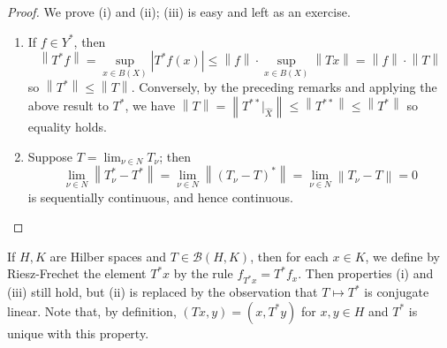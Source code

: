 \documentclass[11pt, a4paper]{memoir}
\newcommand{\norm}[1]{\ensuremath{\left\lVert#1\right\rVert}}
\theoremstyle{change}
\theoremstyle{plain}
\theoremstyle{nonumberplain}
\newtheorem{proof}{Proof}
\newcommand{\inr}[1]{\ensuremath{\left(#1\right)}}
\numberwithin{equation}{section}
\begin{document}
\begin{proof}
    We prove (i) and (ii); (iii) is easy and left as an exercise.
    \begin{enumerate}[nl,r]
        \item If $f\in Y^*$, then
            \begin{equation*}
                \norm{T^*f}=\sup_{x\in B(X)}|T^*f(x)|\leq\norm{f}\cdot\sup_{x\in B(X)}\norm{Tx}=\norm{f}\cdot\norm{T}
            \end{equation*}
            so $\norm{T^*}\leq\norm{T}$.
            Conversely, by the preceding remarks and applying the above result to $T^*$, we have $\norm{T}=\norm{T^{**}|_{\hat X}}\leq\norm{T^{**}}\leq\norm{T^*}$ so equality holds.

        \item Suppose $T=\lim_{\nu\in N}T_\nu$; then
            \begin{equation*}
                \lim_{\nu\in N}\norm{T_\nu^*-T^*} = \lim_{\nu\in N}\norm{(T_\nu-T)^*}=\lim_{\nu\in N}\norm{T_\nu-T}=0
            \end{equation*}
            is sequentially continuous, and hence continuous.
    \end{enumerate}
\end{proof}
If $H,K$ are Hilber spaces and $T\in\mathcal{B}(H,K)$, then for each $x\in K$, we define by Riesz-Frechet the element $T^*x$ by the rule $f_{T^*x}=T^*f_x$.
Then properties (i) and (iii) still hold, but (ii) is replaced by the observation that $T\mapsto T^*$ is conjugate linear.
Note that, by definition, $\inr{Tx,y}=\inr{x,T^*y}$ for $x,y\in H$ and $T^*$ is unique with this property.
\end{document}
